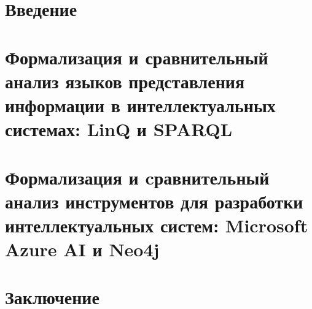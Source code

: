\section*{Введение}


\newpage
\section{Формализация и сравнительный анализ языков представления информации в интеллектуальных системах: LinQ и SPARQL}


\newpage
\section{Формализация и cравнительный анализ инструментов для разработки интеллектуальных систем: Microsoft Azure AI и Neo4j}


\newpage
\section*{Заключение}

